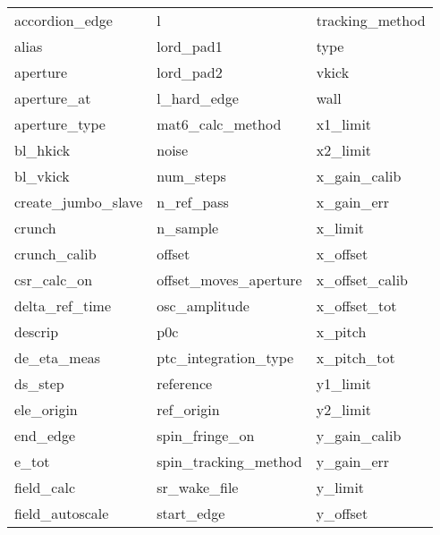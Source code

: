 \begin{tabular}{lll} \toprule
accordion_edge              & l                           & tracking_method             \\
alias                       & lord_pad1                   & type                        \\
aperture                    & lord_pad2                   & vkick                       \\
aperture_at                 & l_hard_edge                 & wall                        \\
aperture_type               & mat6_calc_method            & x1_limit                    \\
bl_hkick                    & noise                       & x2_limit                    \\
bl_vkick                    & num_steps                   & x_gain_calib                \\
create_jumbo_slave          & n_ref_pass                  & x_gain_err                  \\
crunch                      & n_sample                    & x_limit                     \\
crunch_calib                & offset                      & x_offset                    \\
csr_calc_on                 & offset_moves_aperture       & x_offset_calib              \\
delta_ref_time              & osc_amplitude               & x_offset_tot                \\
descrip                     & p0c                         & x_pitch                     \\
de_eta_meas                 & ptc_integration_type        & x_pitch_tot                 \\
ds_step                     & reference                   & y1_limit                    \\
ele_origin                  & ref_origin                  & y2_limit                    \\
end_edge                    & spin_fringe_on              & y_gain_calib                \\
e_tot                       & spin_tracking_method        & y_gain_err                  \\
field_calc                  & sr_wake_file                & y_limit                     \\
field_autoscale                & start_edge                  & y_offset                    \\

\end{tabular}
